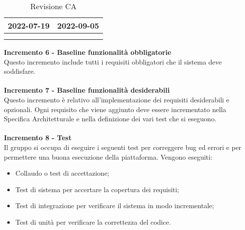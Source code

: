 {{{\begin{longtable}{C{.4\freewidth} C{.4\freewidth}}
        2022-07-19 & 2022-09-05 \\
        \bottomrule
        \\
        \caption{Revisione CA}
        \end{longtable}
        
        
    \textbf{Incremento 6 - Baseline funzionalità obbligatorie} \\
    Questo incremento include tutti i requisiti obbligatori che il sistema deve soddisfare.\\ \\
    \textbf{Incremento 7 - Baseline funzionalità desiderabili} \\ 
    Questo incremento è relativo all'implementazione dei requisiti desiderabili e opzionali. Ogni requisito che viene aggiunto deve essere incrementato nella Specifica Architetturale e nella definizione dei vari test che si eseguono. \\ \\
    \textbf{Incremento 8 - Test} \\ 
    Il gruppo si occupa di eseguire i  seguenti test  per correggere bug ed errori e per permettere una buona esecuzione della piattaforma. Vengono eseguiti:
    \begin{itemize}
        \item Collaudo o test di accettazione;
        \item Test di sistema per accertare la copertura dei requisiti;
        \item Test di integrazione per verificare il sistema in modo incrementale;
        \item Test di unità per verificare la correttezza del codice.
    \end{itemize} 
    }

}
}
